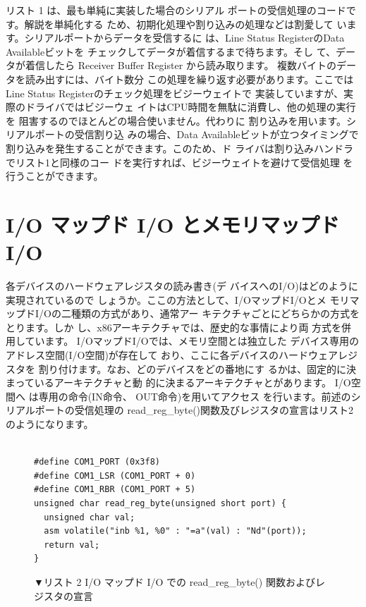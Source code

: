 \documentclass[a4j,12pt]{jarticle}
\begin{document}
 リスト 1 は、最も単純に実装した場合のシリアル
ポートの受信処理のコードです。解説を単純化する
ため、初期化処理や割り込みの処理などは割愛して
います。シリアルポートからデータを受信するに
は、Line Status RegisterのData Availableビットを
チェックしてデータが着信するまで待ちます。そし
て、データが着信したら Receiver Buffer Register
から読み取ります。
 複数バイトのデータを読み出すには、バイト数分
この処理を繰り返す必要があります。ここではLine
Status Registerのチェック処理をビジーウェイトで
実装していますが、実際のドライバではビジーウェ
イトはCPU時間を無駄に消費し、他の処理の実行を
阻害するのでほとんどの場合使いません。代わりに
割り込みを用います。シリアルポートの受信割り込
みの場合、Data Availableビットが立つタイミングで
割り込みを発生することができます。このため、ド
ライバは割り込みハンドラでリスト1と同様のコー
ドを実行すれば、ビジーウェイトを避けて受信処理
を行うことができます。



\section{I/O マップド I/O とメモリマップド I/O}

 各デバイスのハードウェアレジスタの読み書き(デ
バイスへのI/O)はどのように実現されているので
しょうか。ここの方法として、I/OマップドI/Oとメ
モリマップドI/Oの二種類の方式があり、通常アー
キテクチャごとにどちらかの方式をとります。しか
し、x86アーキテクチャでは、歴史的な事情により両
方式を併用しています。
 I/OマップドI/Oでは、メモリ空間とは独立した
デバイス専用のアドレス空間(I/O空間)が存在して
おり、ここに各デバイスのハードウェアレジスタを
割り付けます。なお、どのデバイスをどの番地にす
るかは、固定的に決まっているアーキテクチャと動
的に決まるアーキテクチャとがあります。 I/O空間へ
は専用の命令(IN命令、 OUT命令)を用いてアクセス
を行います。前述のシリアルポートの受信処理の
read\_reg\_byte()関数及びレジスタの宣言はリスト2
のようになります。

\begin{figure}
\begin{verbatim}

#define COM1_PORT (0x3f8)
#define COM1_LSR (COM1_PORT + 0)
#define COM1_RBR (COM1_PORT + 5)
unsigned char read_reg_byte(unsigned short port) {
  unsigned char val;
  asm volatile("inb %1, %0" : "=a"(val) : "Nd"(port));
  return val;
}
\end{verbatim}
\caption{▼リスト 2   I/O マップド I/O での read\_reg\_byte() 関数およびレジスタの宣言}
\end{figure}
\end{document}
